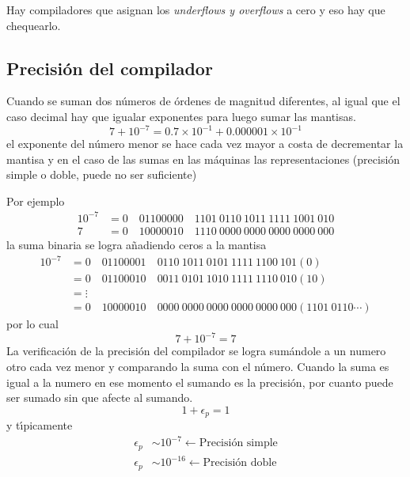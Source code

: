 \documentclass[spanish,titlepage,11pt]{article}
\begin{document}
Hay compiladores que asignan los \textit{underflows y overflows} a cero y eso
hay que chequearlo.

\subsection{Precisi\'{o}n del compilador}

Cuando se suman dos n\'{u}meros de \'{o}rdenes de magnitud diferentes, al
igual que el caso decimal hay que igualar exponentes para luego sumar las
mantisas.
\begin{equation}
7+10^{-7}=0.7\times10^{-1}+0.000001\times10^{-1}%
\end{equation}
el exponente del n\'{u}mero menor se hace cada vez mayor a costa de
decrementar la mantisa y en el caso de las sumas en las m\'{a}quinas las
representaciones (precisi\'{o}n simple o doble, puede no ser suficiente)

Por ejemplo
\begin{align}
10^{-7}  &  =0\quad01100000\quad1101\ 0110\ 1011\ 1111\ 1001\ 010\\
7  &  =0\quad10000010\quad1110\ 0000\ 0000\ 0000\ 0000\ 000
\end{align}
la suma binaria se logra a\~{n}adiendo ceros a la mantisa
\begin{align}
10^{-7}  &  =0\quad01100001\quad0110\ 1011\ 0101\ 1111\ 1100\ 101\left(
0\right) \\
&  =0\quad01100010\quad0011\ 0101\ 1010\ 1111\ 1110\ 010\left(  10\right) \\
&  =\vdots\\
&  =0\quad10000010\quad0000\ 0000\ 0000\ 0000\ 0000\ 000\left(
1101\ 0110\cdots\right)
\end{align}
por lo cual
\begin{equation}
7+10^{-7}=7
\end{equation}
La verificaci\'{o}n de la precisi\'{o}n del compilador se logra sum\'{a}ndole
a un numero otro cada vez menor y comparando la suma con el n\'{u}mero. Cuando
la suma es igual a la numero en ese momento el sumando es la precisi\'{o}n,
por cuanto puede ser sumado sin que afecte al sumando.
\begin{equation}
1+\epsilon_{p}=1
\end{equation}
y t\'{\i}picamente
\begin{align}
\epsilon_{p}  &  \sim10^{-7}\longleftarrow\text{Precisi\'{o}n simple}\\
\epsilon_{p}  &  \sim10^{-16}\longleftarrow\text{Precisi\'{o}n doble}%
\end{align}
\end{document}
